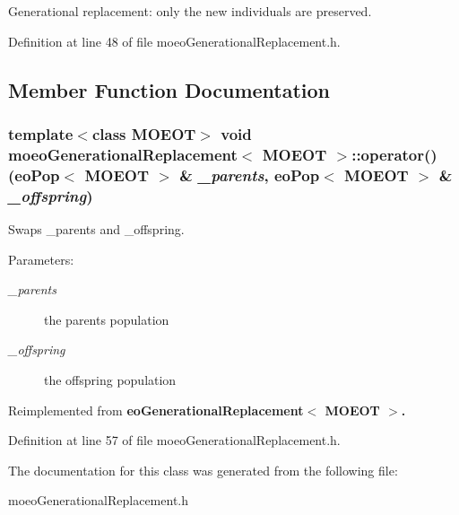 Generational replacement: only the new individuals are preserved. 



Definition at line 48 of file moeo\-Generational\-Replacement.h.

\subsection{Member Function Documentation}
\subsubsection{\setlength{\rightskip}{0pt plus 5cm}template$<$class MOEOT$>$ void \bf{moeo\-Generational\-Replacement}$<$ MOEOT $>$::operator() (\bf{eo\-Pop}$<$ MOEOT $>$ \& {\em \_\-parents}, \bf{eo\-Pop}$<$ MOEOT $>$ \& {\em \_\-offspring})\hspace{0.3cm}{\tt  [inline]}}\label{classmoeoGenerationalReplacement_7b8ac20d375820ba44a9f3dd4b95e120}


Swaps \_\-parents and \_\-offspring. 

\begin{Desc}
\item[Parameters:]
\begin{description}
\item[{\em \_\-parents}]the parents population \item[{\em \_\-offspring}]the offspring population \end{description}
\end{Desc}


Reimplemented from \bf{eo\-Generational\-Replacement$<$ MOEOT $>$}.

Definition at line 57 of file moeo\-Generational\-Replacement.h.

The documentation for this class was generated from the following file:\begin{CompactItemize}
\item 
moeo\-Generational\-Replacement.h\end{CompactItemize}
